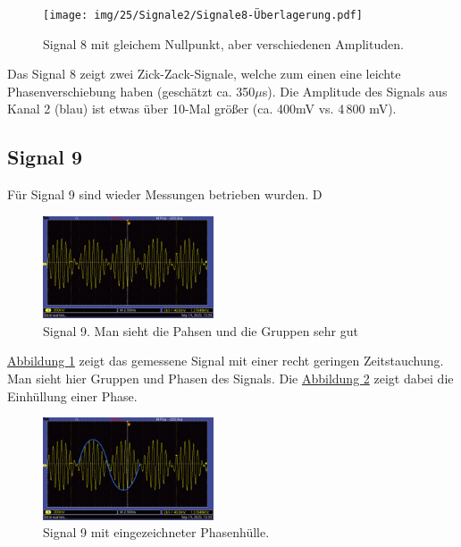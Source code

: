 \begin{figure} [h!]
    \centering
        \texttt{[image: img/25/Signale2/Signale8-Überlagerung.pdf]}
    \caption{Signal 8 mit gleichem Nullpunkt, aber verschiedenen Amplituden.}
\end{figure}

Das Signal 8 zeigt zwei Zick-Zack-Signale, welche zum einen eine leichte Phasenverschiebung haben (geschätzt ca. 350$\mu$s). Die Amplitude des Signals aus Kanal 2 (blau) ist etwas über 10-Mal größer (ca. 400mV vs. 4\,800 mV).

\newpage 

\subsection*{Signal 9}

Für Signal 9 sind wieder Messungen betrieben wurden. D
\begin{figure} [h!]
    \centering
        \includegraphics[width=0.45\textwidth]{img/25/Signale2/Signal9-Gesamt.pdf}
    \caption{Signal 9. Man sieht die Pahsen und die Gruppen sehr gut}
    \label{fig:s9_ges}
\end{figure}

\hyperref[fig:s9_ges]{Abbildung \ref*{fig:s9_ges}} zeigt das gemessene Signal mit einer recht geringen Zeitstauchung. Man sieht hier Gruppen und Phasen des Signals. Die \hyperref[fig:s9_phahue]{Abbildung \ref*{fig:s9_phahue}} zeigt dabei die Einhüllung einer Phase.

\begin{figure} [h!]
    \centering
        \includegraphics[width=0.45\textwidth]{img/25/Signale2/Signal9-Sin-eingezeichnet.pdf}
    \caption{Signal 9 mit eingezeichneter Phasenhülle.}
    \label{fig:s9_phahue}
\end{figure}


